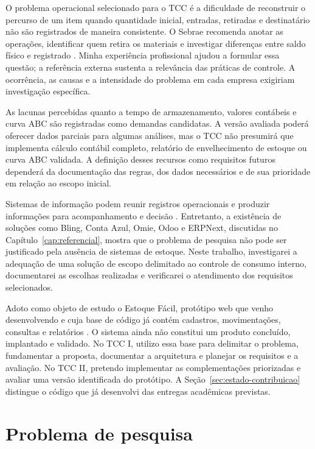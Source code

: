 O problema operacional selecionado para o TCC é a dificuldade de reconstruir o percurso de um item quando quantidade inicial, entradas, retiradas e destinatário não são registrados de maneira consistente. O Sebrae recomenda anotar as operações, identificar quem retira os materiais e investigar diferenças entre saldo físico e registrado \cite{SebraeControle2026}. Minha experiência profissional ajudou a formular essa questão; a referência externa sustenta a relevância das práticas de controle. A ocorrência, as causas e a intensidade do problema em cada empresa exigiriam investigação específica.

As lacunas percebidas quanto a tempo de armazenamento, valores contábeis e curva ABC são registradas como demandas candidatas. A versão avaliada poderá oferecer dados parciais para algumas análises, mas o TCC não presumirá que implementa cálculo contábil completo, relatório de envelhecimento de estoque ou curva ABC validada. A definição desses recursos como requisitos futuros dependerá da documentação das regras, dos dados necessários e de sua prioridade em relação ao escopo inicial.

Sistemas de informação podem reunir registros operacionais e produzir informações para acompanhamento e decisão \cite{OpenStaxSI}. Entretanto, a existência de soluções como Bling, Conta Azul, Omie, Odoo e ERPNext, discutidas no Capítulo~\ref{cap:referencial}, mostra que o problema de pesquisa não pode ser justificado pela ausência de sistemas de estoque. Neste trabalho, investigarei a adequação de uma solução de escopo delimitado ao controle de consumo interno, documentarei as escolhas realizadas e verificarei o atendimento dos requisitos selecionados.

Adoto como objeto de estudo o Estoque Fácil, protótipo web que venho desenvolvendo e cuja base de código já contém cadastros, movimentações, consultas e relatórios \cite{EstoqueFacilRepositorio}. O sistema ainda não constitui um produto concluído, implantado e validado. No TCC I, utilizo essa base para delimitar o problema, fundamentar a proposta, documentar a arquitetura e planejar os requisitos e a avaliação. No TCC II, pretendo implementar as complementações priorizadas e avaliar uma versão identificada do protótipo. A Seção~\ref{sec:estado-contribuicao} distingue o código que já desenvolvi das entregas acadêmicas previstas.

\section{Problema de pesquisa}


